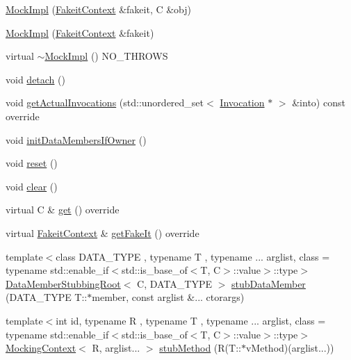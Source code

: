 \begin{DoxyCompactItemize}
\item 
\mbox{\hyperlink{classfakeit_1_1MockImpl_aeabb99e36f2ef5fea7856db165fe01d3}{Mock\+Impl}} (\mbox{\hyperlink{structfakeit_1_1FakeitContext}{Fakeit\+Context}} \&fakeit, C \&obj)
\item 
\mbox{\hyperlink{classfakeit_1_1MockImpl_ae6f86001c16b110046453433ba2d36e8}{Mock\+Impl}} (\mbox{\hyperlink{structfakeit_1_1FakeitContext}{Fakeit\+Context}} \&fakeit)
\item 
virtual \mbox{\hyperlink{classfakeit_1_1MockImpl_aafbd9e9c1f6691f7cee440c52ae07220}{$\sim$\+Mock\+Impl}} () N\+O\+\_\+\+T\+H\+R\+O\+WS
\item 
void \mbox{\hyperlink{classfakeit_1_1MockImpl_a48e09b74451cf9c435aab31b077cce26}{detach}} ()
\item 
void \mbox{\hyperlink{classfakeit_1_1MockImpl_a04c3121eb7d380226f1beabf4b18ee82}{get\+Actual\+Invocations}} (std\+::unordered\+\_\+set$<$ \mbox{\hyperlink{structfakeit_1_1Invocation}{Invocation}} $\ast$ $>$ \&into) const override
\item 
void \mbox{\hyperlink{classfakeit_1_1MockImpl_ad403c33f4734e31196ead952fc4c4805}{init\+Data\+Members\+If\+Owner}} ()
\item 
void \mbox{\hyperlink{classfakeit_1_1MockImpl_aad69a9c36fc64d0890f21ff15318a206}{reset}} ()
\item 
void \mbox{\hyperlink{classfakeit_1_1MockImpl_a3985505d2ec7bd50a5d71f155c5ae458}{clear}} ()
\item 
virtual C \& \mbox{\hyperlink{classfakeit_1_1MockImpl_a8f287e857fde9a0941c618ff5459bd88}{get}} () override
\item 
virtual \mbox{\hyperlink{structfakeit_1_1FakeitContext}{Fakeit\+Context}} \& \mbox{\hyperlink{classfakeit_1_1MockImpl_a1b51dd1918a32ec5d450fc804ad37e63}{get\+Fake\+It}} () override
\item 
{\footnotesize template$<$class D\+A\+T\+A\+\_\+\+T\+Y\+PE , typename T , typename ... arglist, class  = typename std\+::enable\+\_\+if$<$std\+::is\+\_\+base\+\_\+of$<$\+T, C$>$\+::value$>$\+::type$>$ }\\\mbox{\hyperlink{classfakeit_1_1DataMemberStubbingRoot}{Data\+Member\+Stubbing\+Root}}$<$ C, D\+A\+T\+A\+\_\+\+T\+Y\+PE $>$ \mbox{\hyperlink{classfakeit_1_1MockImpl_acaa4bcb3984d3ca5fd1ecb3095393951}{stub\+Data\+Member}} (D\+A\+T\+A\+\_\+\+T\+Y\+PE T\+::$\ast$member, const arglist \&... ctorargs)
\item 
{\footnotesize template$<$int id, typename R , typename T , typename ... arglist, class  = typename std\+::enable\+\_\+if$<$std\+::is\+\_\+base\+\_\+of$<$\+T, C$>$\+::value$>$\+::type$>$ }\\\mbox{\hyperlink{classfakeit_1_1MockingContext}{Mocking\+Context}}$<$ R, arglist... $>$ \mbox{\hyperlink{classfakeit_1_1MockImpl_a603befd40e35ea88c7efee965f15bb60}{stub\+Method}} (R(T\+::$\ast$v\+Method)(arglist...))

\end{DoxyCompactItemize}

